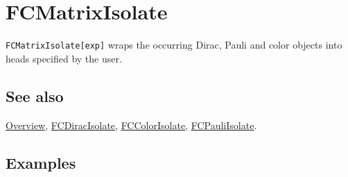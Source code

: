 \documentclass[../FeynCalcManual.tex]{subfiles}
\begin{document}
\hypertarget{fcmatrixisolate}{
\section{FCMatrixIsolate}\label{fcmatrixisolate}}

\texttt{FCMatrixIsolate[\allowbreak{}exp]} wraps the occurring Dirac,
Pauli and color objects into heads specified by the user.

\subsection{See also}

\hyperlink{toc}{Overview}, \hyperlink{fcdiracisolate}{FCDiracIsolate},
\hyperlink{fccolorisolate}{FCColorIsolate},
\hyperlink{fcpauliisolate}{FCPauliIsolate}.

\subsection{Examples}
\end{document}
